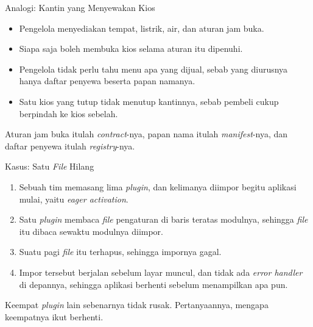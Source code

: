 \documentclass[aspectratio=169, table, 12pt]{beamer}
\begin{document}
\begin{frame}{{\Large Analogi: Kantin yang Menyewakan Kios}}
  \vspace{10pt}
  \begin{itemize}\small
    \item Pengelola menyediakan tempat, listrik, air, dan aturan jam buka.
    \item Siapa saja boleh membuka kios selama aturan itu dipenuhi.
    \item Pengelola tidak perlu tahu menu apa yang dijual, sebab yang diurusnya
          hanya daftar penyewa beserta papan namanya.
    \item Satu kios yang tutup tidak menutup kantinnya, sebab pembeli cukup
          berpindah ke kios sebelah.
  \end{itemize}

  \vspace{10pt}
  {\small Aturan jam buka itulah \textit{contract}-nya, papan nama itulah \textit{manifest}-nya, dan
  daftar penyewa itulah \textit{registry}-nya.}
\end{frame}

\begin{frame}{{\Large Kasus: Satu \textit{File} Hilang}}
  \vspace{8pt}
  \begin{enumerate}\small
    \item Sebuah tim memasang lima \textit{plugin}, dan kelimanya diimpor begitu
          aplikasi mulai, yaitu \textit{eager activation}.
    \item Satu \textit{plugin} membaca \textit{file} pengaturan di baris teratas
          modulnya, sehingga \textit{file} itu dibaca sewaktu modulnya diimpor.
    \item Suatu pagi \textit{file} itu terhapus, sehingga impornya gagal.
    \item Impor tersebut berjalan sebelum layar muncul, dan tidak ada
          \textit{error handler} di depannya, sehingga aplikasi berhenti sebelum
          menampilkan apa pun.
  \end{enumerate}

  \vspace{8pt}
  {\small Keempat \textit{plugin} lain sebenarnya tidak rusak. Pertanyaannya,
  mengapa keempatnya ikut berhenti.}
\end{frame}
\end{document}
